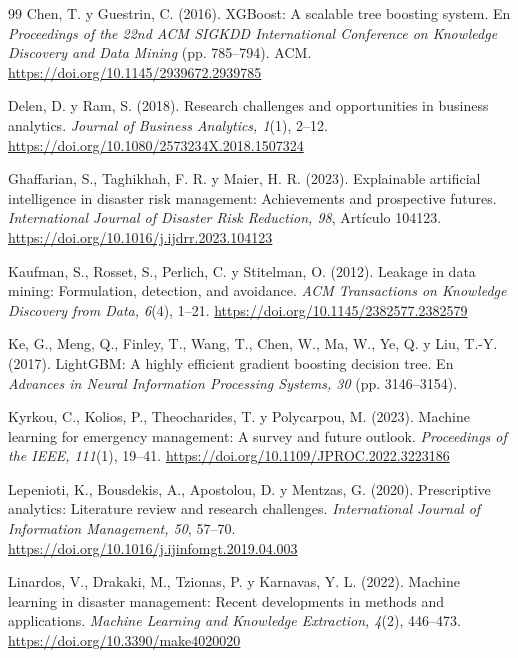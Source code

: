 \documentclass[12pt,a4paper]{article}
\begin{document}
\begin{thebibliography}{99}
Chen, T. y Guestrin, C. (2016). XGBoost: A scalable tree boosting system. En \emph{Proceedings of the 22nd ACM SIGKDD
International Conference on Knowledge Discovery and Data Mining} (pp. 785--794). ACM.
\url{https://doi.org/10.1145/2939672.2939785}

Delen, D. y Ram, S. (2018). Research challenges and opportunities in business analytics. \emph{Journal of
Business Analytics, 1}(1), 2--12. \url{https://doi.org/10.1080/2573234X.2018.1507324}

Ghaffarian, S., Taghikhah, F. R. y Maier, H. R. (2023). Explainable artificial intelligence in disaster risk
management: Achievements and prospective futures. \emph{International Journal of Disaster Risk Reduction, 98},
Artículo 104123. \url{https://doi.org/10.1016/j.ijdrr.2023.104123}

Kaufman, S., Rosset, S., Perlich, C. y Stitelman, O. (2012). Leakage in data mining: Formulation, detection, and
avoidance. \emph{ACM Transactions on Knowledge Discovery from Data, 6}(4), 1--21.
\url{https://doi.org/10.1145/2382577.2382579}

Ke, G., Meng, Q., Finley, T., Wang, T., Chen, W., Ma, W., Ye, Q. y Liu, T.-Y. (2017). LightGBM: A highly efficient
gradient boosting decision tree. En \emph{Advances in Neural Information Processing Systems, 30} (pp. 3146--3154).

Kyrkou, C., Kolios, P., Theocharides, T. y Polycarpou, M. (2023). Machine learning for emergency management: A
survey and future outlook. \emph{Proceedings of the IEEE, 111}(1), 19--41.
\url{https://doi.org/10.1109/JPROC.2022.3223186}

Lepenioti, K., Bousdekis, A., Apostolou, D. y Mentzas, G. (2020). Prescriptive analytics: Literature review and
research challenges. \emph{International Journal of Information Management, 50}, 57--70.
\url{https://doi.org/10.1016/j.ijinfomgt.2019.04.003}

Linardos, V., Drakaki, M., Tzionas, P. y Karnavas, Y. L. (2022). Machine learning in disaster management: Recent
developments in methods and applications. \emph{Machine Learning and Knowledge Extraction, 4}(2), 446--473.
\url{https://doi.org/10.3390/make4020020}


\end{thebibliography}
\end{document}
